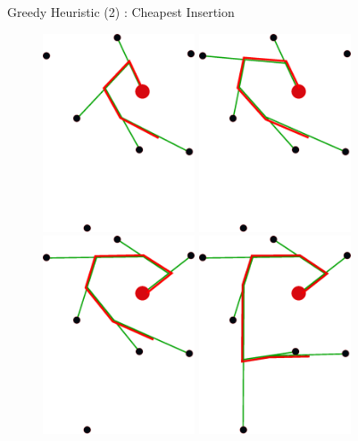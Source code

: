 \documentclass{beamer}
\begin{document}
\begin{frame}{Greedy Heuristic (2) : Cheapest Insertion }
\begin{figure}[H]
      {%
        \includegraphics[width=4.5cm]{slide_imgs/point4.eps}
      }%
      {%
        \includegraphics[width=4.5cm]{slide_imgs/point5.eps}
      }%
      {%
        \includegraphics[width=4.5cm]{slide_imgs/point6.eps}
      }%
      {%
        \includegraphics[width=4.5cm]{slide_imgs/point7.eps}
      }%


\end{figure}
\end{frame}
\end{document}
